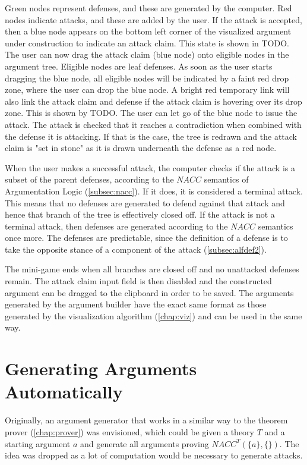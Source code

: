 \documentclass[11pt,twoside,a4paper]{report}
\begin{document}
Green nodes represent defenses, and these are generated by the computer. Red nodes indicate attacks, and these are added by the user. If the attack is accepted, then a blue node appears on the bottom left corner of the visualized argument under construction to indicate an attack claim. This state is shown in TODO. The user can now drag the attack claim (blue node) onto eligible nodes in the argument tree. Eligible nodes are leaf defenses. As soon as the user starts dragging the blue node, all eligible nodes will be indicated by a faint red drop zone, where the user can drop the blue node. A bright red temporary link will also link the attack claim and defense if the attack claim is hovering over its drop zone. This is shown by TODO. The user can let go of the blue node to issue the attack. The attack is checked that it reaches a contradiction when combined with the defense it is attacking. If that is the case, the tree is redrawn and the attack claim is "set in stone" as it is drawn underneath the defense as a red node.

When the user makes a successful attack, the computer checks if the attack is a subset of the parent defenses, according to the $NACC$ semantics of Argumentation Logic (\autoref{subsec:nacc}). If it does, it is considered a terminal attack. This means that no defenses are generated to defend against that attack and hence that branch of the tree is effectively closed off. If the attack is not a terminal attack, then defenses are generated according to the $NACC$ semantics once more. The defenses are predictable, since the definition of a defense is to take the opposite stance of a component of the attack (\autoref{subsec:alfdef2}).

The mini-game ends when all branches are closed off and no unattacked defenses remain. The attack claim input field is then disabled and the constructed argument can be dragged to the clipboard in order to be saved. The arguments generated by the argument builder have the exact same format as those generated by the visualization algorithm (\autoref{chap:viz}) and can be used in the same way.

\section{Generating Arguments Automatically}
Originally, an argument generator that works in a similar way to the theorem prover (\autoref{chap:prover}) was envisioned, which could be given a theory $T$ and a starting argument $a$ and generate all arguments proving $NACC^T(\{a\},\{ \})$. The idea was dropped as a lot of computation would be necessary to generate attacks.
\end{document}
